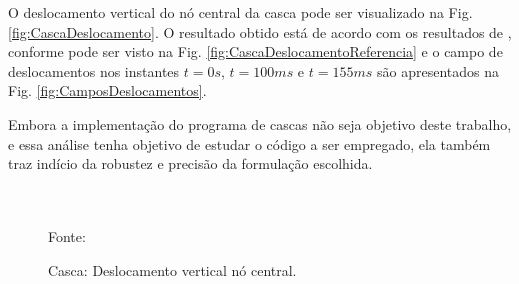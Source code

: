 \documentclass[tese_patricia]{subfiles}
\begin{document}
O deslocamento vertical do nó central da casca pode ser visualizado na Fig. \ref{fig:CascaDeslocamento}. O resultado obtido está de acordo com os resultados de , conforme pode ser visto na Fig. \ref{fig:CascaDeslocamentoReferencia} e o campo de deslocamentos nos instantes $t = 0s$, $t = 100ms$ e $t = 155ms$ são apresentados na Fig. \ref{fig:CamposDeslocamentos}.

Embora a implementação do programa de cascas não seja objetivo deste trabalho, e essa análise tenha objetivo de estudar o código a ser empregado, ela também traz indício da robustez e precisão da formulação escolhida.

\begin{figure}[!htb]
	\centering
	 \\
	\\
	Fonte: 
	\caption{Casca: Deslocamento vertical nó central.}
	\label{fig:CascaDeslocamentoT}
\end{figure}
\end{document}
